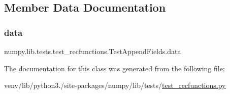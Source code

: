 \subsection{Member Data Documentation}
\mbox{\label{classnumpy_1_1lib_1_1tests_1_1test__recfunctions_1_1TestAppendFields_a2aff68da3a45344ceb82631bea7f6496}} 
\subsubsection{\texorpdfstring{data}{data}}
{\footnotesize\ttfamily numpy.\+lib.\+tests.\+test\+\_\+recfunctions.\+Test\+Append\+Fields.\+data}



The documentation for this class was generated from the following file\+:\begin{DoxyCompactItemize}
\item 
venv/lib/python3./site-\/packages/numpy/lib/tests/\hyperlink{test__recfunctions_8py}{test\+\_\+recfunctions.\+py}\end{DoxyCompactItemize}
